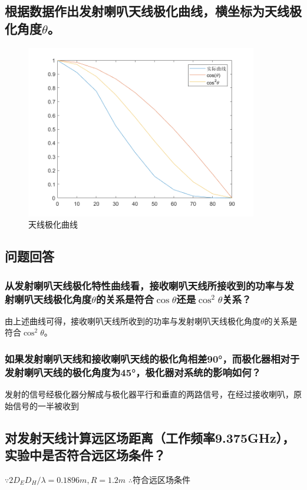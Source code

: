 \documentclass{../source/zjureport}
\begin{document}
        \subsection{根据数据作出发射喇叭天线极化曲线，横坐标为天线极化角度$\theta$。}
        \begin{figure}[H]
            \centering
            \includegraphics[width = 0.9\textwidth]{figure/天线极化测量.png}
            \caption{天线极化曲线}
        \end{figure}

        \subsection{问题回答}
            \subsubsection{从发射喇叭天线极化特性曲线看，接收喇叭天线所接收到的功率与发射喇叭天线极化角度$\theta$的关系是符合$\cos\theta$还是$\cos^2\theta$关系？}
            由上述曲线可得，接收喇叭天线所收到的功率与发射喇叭天线极化角度$\theta$的关系是符合$\cos^2\theta$。
            \subsubsection{如果发射喇叭天线和接收喇叭天线的极化角相差90°，而极化器相对于发射喇叭天线的极化角度为45°，极化器对系统的影响如何？}
            发射的信号经极化器分解成与极化器平行和垂直的两路信号，在经过接收喇叭，原始信号的一半被收到

        \subsection{对发射天线计算远区场距离（工作频率9.375GHz），实验中是否符合远区场条件？}
        $\because 2D_ED_H/\lambda = 0.1896m , R = 1.2m$
        $\therefore $符合远区场条件
\end{document}
